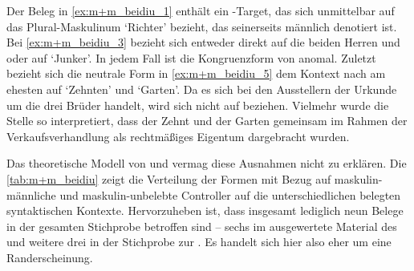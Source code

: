 Der Beleg in \cref{ex:m+m_beidiu_1} enthält ein -Target, das sich
unmittelbar auf das Plural-Maskulinum  `Richter' bezieht, das
seinerseits männlich denotiert ist.
Bei \cref{ex:m+m_beidiu_3} bezieht sich  entweder direkt auf die
beiden Herren  und 
oder auf  `Junker'. In jedem Fall ist die Kongruenzform
von  anomal. Zuletzt bezieht sich die neutrale Form  in
\cref{ex:m+m_beidiu_5} dem Kontext nach am ehesten auf
 `Zehnten' und  `Garten'. Da es sich bei
den Ausstellern der Urkunde um die drei Brüder  \autocites(Nrn.~1201~AB)[472,6--7]{cao2}
handelt, wird sich  nicht auf  beziehen. Vielmehr wurde
die Stelle so interpretiert, dass der Zehnt und der Garten gemeinsam im Rahmen
der Verkaufsverhandlung als rechtmäßiges Eigentum dargebracht wurden.

Das theoretische Modell von \citet{wechsler2009} und \citet{wechslerzlatic2003}
vermag diese Ausnahmen nicht zu erklären. Die \cref{tab:m+m_beidiu} zeigt die
Verteilung der Formen mit Bezug auf maskulin-männliche und maskulin-unbelebte
Controller auf die unterschiedlichen belegten syntaktischen Kontexte.
Hervorzuheben ist, dass insgesamt lediglich neun Belege in der gesamten
Stichprobe betroffen sind -- sechs im ausgewertete Material des \CAO{}
und weitere drei in der Stichprobe zur \KC{}. Es handelt sich hier
also eher um eine Randerscheinung.

